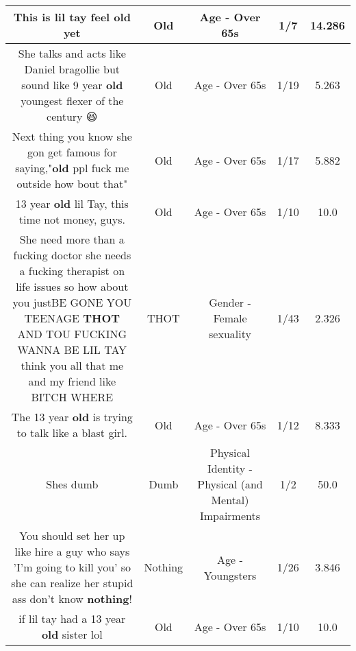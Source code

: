 \documentclass[11pt]{article}
\newlength\mylength
\begin{document}
\begin{center}
\begin{longtable}{|C{.65\mylength}|C{.30\mylength}|C{.12\mylength}|C{.12\mylength}|C{.12\mylength}|}
  \small This is lil tay feel \textbf{old} yet\normalsize   & Old & Age - Over 65s & 1/7 & 14.286 \\  \hline
  \small She talks and acts like Daniel bragollie but sound like 9 year \textbf{old} youngest flexer of the century 😆\normalsize   & Old & Age - Over 65s & 1/19 & 5.263 \\  \hline
  \small Next thing you know she gon get famous for saying,"\textbf{old} ppl fuck me outside how bout that"\normalsize   & Old & Age - Over 65s & 1/17 & 5.882 \\  \hline
  \small 13 year \textbf{old} lil Tay, this time not money, guys.\normalsize   & Old & Age - Over 65s & 1/10 & 10.0 \\  \hline
  \small She need more than a fucking doctor she needs a fucking therapist on life issues so how about you justBE GONE YOU TEENAGE \textbf{THOT} AND TOU FUCKING WANNA BE LIL TAY think you all that me and my friend like BITCH WHERE\normalsize   & THOT & Gender - Female sexuality & 1/43 & 2.326 \\  \hline
  \small The 13 year \textbf{old} is trying to talk like a blast girl.\normalsize   & Old & Age - Over 65s & 1/12 & 8.333 \\  \hline
  \small Shes dumb\normalsize   & Dumb & Physical Identity - Physical (and Mental) Impairments & 1/2 & 50.0 \\  \hline
  \small You should set her up like hire a guy who says 'I'm going to kill you' so she can realize her stupid ass don't know \textbf{nothing}!\normalsize   & Nothing & Age - Youngsters & 1/26 & 3.846 \\  \hline
  \small if lil tay had a 13 year \textbf{old} sister lol\normalsize   & Old & Age - Over 65s & 1/10 & 10.0 \\  \hline

\end{longtable}
\end{center}
\end{document}
